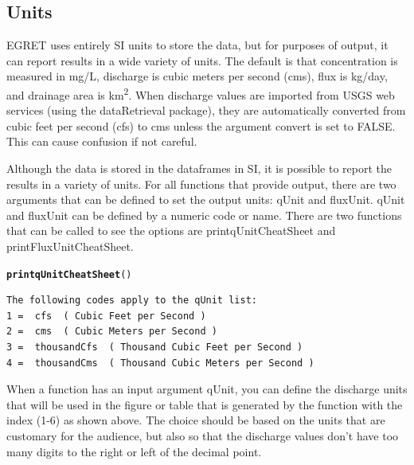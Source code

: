 \documentclass[a4paper,11pt]{article}\usepackage[]{graphicx}\usepackage[]{color}
\makeatletter
\newcommand{\hlstd}[1]{\textcolor[rgb]{0.345,0.345,0.345}{#1}}%
\newcommand{\hlkwd}[1]{\textcolor[rgb]{0.737,0.353,0.396}{\textbf{#1}}}%
\newenvironment{kframe}{%
 \def\at@end@of@kframe{}%
 \ifinner\ifhmode%
  \def\at@end@of@kframe{\end{minipage}}%
  \begin{minipage}{\columnwidth}%
 \fi\fi%
 \def\FrameCommand##1{\hskip\@totalleftmargin \hskip-\fboxsep
 \colorbox{shadecolor}{##1}\hskip-\fboxsep
     \hskip-\linewidth \hskip-\@totalleftmargin \hskip\columnwidth}%
 \MakeFramed {\advance\hsize-\width
   \@totalleftmargin\z@ \linewidth\hsize
   \@setminipage}}%
 {\par\unskip\endMakeFramed%
 \at@end@of@kframe}
\newenvironment{knitrout}{}{} %
\makeatother
\begin{document}
\FloatBarrier
\pagebreak


\subsection{Units}
\label{sec:units}
EGRET uses entirely SI units to store the data, but for purposes of output, it can report results in a wide variety of units. The default is that concentration is measured in mg/L, discharge is cubic meters per second (cms), flux is kg/day, and drainage area is km\textsuperscript{2}. When discharge values are imported from USGS web services (using the dataRetrieval package), they are automatically converted from cubic feet per second (cfs) to cms unless the argument convert is set to FALSE.  This can cause confusion if not careful. 

Although the data is stored in the dataframes in SI, it is possible to report the results in a variety of units. For all functions that provide output, there are two arguments that can be defined to set the output units: qUnit and fluxUnit.  qUnit and fluxUnit can be defined by a numeric code or name.  There are two functions that can be called to see the options are printqUnitCheatSheet and printFluxUnitCheatSheet.


\begin{knitrout}
\color{fgcolor}\begin{kframe}
\begin{alltt}
\hlkwd{printqUnitCheatSheet}\hlstd{()}
\end{alltt}
\begin{verbatim}
The following codes apply to the qUnit list:
1 =  cfs  ( Cubic Feet per Second )
2 =  cms  ( Cubic Meters per Second )
3 =  thousandCfs  ( Thousand Cubic Feet per Second )
4 =  thousandCms  ( Thousand Cubic Meters per Second )
\end{verbatim}
\end{kframe}
\end{knitrout}


When a function has an input argument qUnit, you can define the discharge units that will be used in the figure or table that is generated by the function with the index (1-6) as shown above. The choice should be based on the units that are customary for the audience, but also so that the discharge values don't have too many digits to the right or left of the decimal point.
\end{document}

